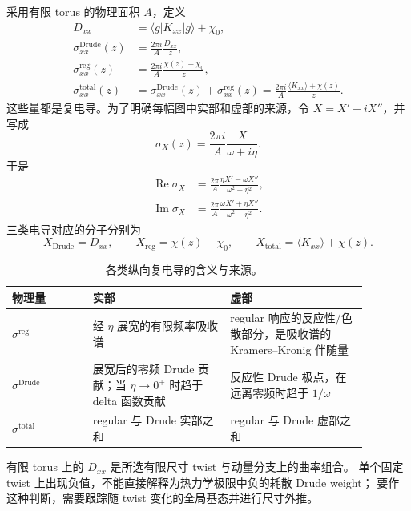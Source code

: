 \documentclass[11pt]{article}
\begin{document}
采用有限 torus 的物理面积 \(A\)，定义
\begin{align}
  D_{xx}&=\langle g\rvert K_{xx}\lvert g\rangle+\chi_0, \\
  \sigma_{xx}^{\mathrm{Drude}}(z)
    &=\frac{2\pi i}{A}\frac{D_{xx}}{z}, \\
  \sigma_{xx}^{\mathrm{reg}}(z)
    &=\frac{2\pi i}{A}\frac{\chi(z)-\chi_0}{z}, \\
  \sigma_{xx}^{\mathrm{total}}(z)
    &=\sigma_{xx}^{\mathrm{Drude}}(z)
      +\sigma_{xx}^{\mathrm{reg}}(z)
      =\frac{2\pi i}{A}
       \frac{\langle K_{xx}\rangle+\chi(z)}{z}.
  \label{eq:conductivity-parts}
\end{align}
这些量都是复电导。为了明确每幅图中实部和虚部的来源，令 \(X=X'+iX''\)，并写成
\begin{equation}
  \sigma_X(z)=\frac{2\pi i}{A}\frac{X}{\omega+i\eta}.
\end{equation}
于是
\begin{align}
  \operatorname{Re}\sigma_X
   &=\frac{2\pi}{A}
     \frac{\eta X'-\omega X''}{\omega^2+\eta^2}, \\
  \operatorname{Im}\sigma_X
   &=\frac{2\pi}{A}
     \frac{\omega X'+\eta X''}{\omega^2+\eta^2}.
  \label{eq:real-imag-source}
\end{align}
三类电导对应的分子分别为
\begin{equation}
  X_{\mathrm{Drude}}=D_{xx},\qquad
  X_{\mathrm{reg}}=\chi(z)-\chi_0,\qquad
  X_{\mathrm{total}}=\langle K_{xx}\rangle+\chi(z).
\end{equation}

\begin{table}[h]
\centering
\small
\caption{各类纵向复电导的含义与来源。}
\begin{tabular}{p{0.20\linewidth}p{0.34\linewidth}p{0.34\linewidth}}
\toprule
物理量 & 实部 & 虚部 \\
\midrule
\(\sigma^{\mathrm{reg}}\) & 经 \(\eta\) 展宽的有限频率吸收谱 &
regular 响应的反应性/色散部分，是吸收谱的 Kramers--Kronig 伴随量 \\
\(\sigma^{\mathrm{Drude}}\) & 展宽后的零频 Drude 贡献；当
\(\eta\to0^+\) 时趋于 delta 函数贡献 & 反应性 Drude 极点，在远离零频时趋于
\(1/\omega\) \\
\(\sigma^{\mathrm{total}}\) & regular 与 Drude 实部之和 & regular 与 Drude
虚部之和 \\
\bottomrule
\end{tabular}
\end{table}

有限 torus 上的 \(D_{xx}\) 是所选有限尺寸 twist 与动量分支上的曲率组合。
单个固定 twist 上出现负值，不能直接解释为热力学极限中负的耗散 Drude weight；
要作这种判断，需要跟踪随 twist 变化的全局基态并进行尺寸外推。
\end{document}
